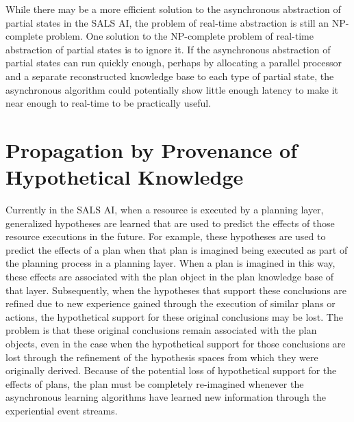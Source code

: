 While there may be a more efficient solution to the asynchronous
abstraction of partial states in the SALS AI, the problem of real-time
abstraction is still an NP-complete problem.  One solution to the
NP-complete problem of real-time abstraction of partial states is to
ignore it.  If the asynchronous abstraction of partial states can run
quickly enough, perhaps by allocating a parallel processor and a
separate reconstructed knowledge base to each type of partial state,
the asynchronous algorithm could potentially show little enough
latency to make it near enough to real-time to be practically useful.

\section{Propagation by Provenance of Hypothetical Knowledge}

Currently in the SALS AI, when a resource is executed by a planning
layer, generalized hypotheses are learned that are used to predict the
effects of those resource executions in the future.  For example,
these hypotheses are used to predict the effects of a plan when that
plan is imagined being executed as part of the planning process in a
planning layer.  When a plan is imagined in this way, these effects
are associated with the plan object in the plan knowledge base of that
layer.  Subsequently, when the hypotheses that support these
conclusions are refined due to new experience gained through the
execution of similar plans or actions, the hypothetical support for
these original conclusions may be lost.  The problem is that these
original conclusions remain associated with the plan objects, even in
the case when the hypothetical support for those conclusions are lost
through the refinement of the hypothesis spaces from which they were
originally derived.  Because of the potential loss of hypothetical
support for the effects of plans, the plan must be completely
re-imagined whenever the asynchronous learning algorithms have learned
new information through the experiential event streams.

